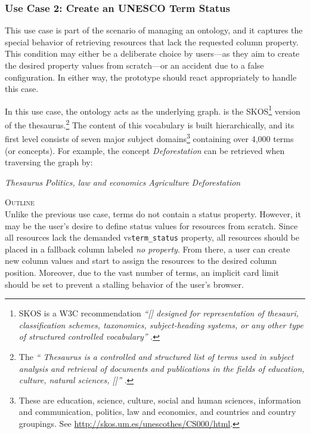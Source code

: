 \subsubsection{Use Case 2: Create an UNESCO Term Status}\label{ssec:UseCase2-Unesco Thesaurus}

This use case is part of the scenario of managing an ontology, and it captures the special behavior of retrieving resources that lack the requested column property. This condition may either be a deliberate choice by users—as they aim to create the desired property values from scratch—or an accident due to a false configuration. In either way, the prototype should react appropriately to handle this case.


In this use case, the  ontology \parencite{PastorSanchez2015} acts as the underlying graph. \mbox{} is the \acrshort*{SKOS}\footnote{\acrfull*{SKOS} is a W3C recommendation \textit{“[\textellipsis{}] designed for representation of thesauri, classification schemes, taxonomies, subject-heading systems, or any other type of structured controlled vocabulary”} \parencite[455]{Garoufallou2015}.} version of the  thesaurus.\footnote{The \textit{“ Thesaurus is a controlled and structured list of terms used in subject analysis and retrieval of documents and publications in the fields of education, culture, natural sciences, [\textellipsis{}]”} \parencite{UNESCO}.} The content of this vocabulary is built hierarchically, and its first level consists of seven major subject domains\footnote{These are education, science, culture, social and human sciences, information and communication, politics, law and economics, and countries and country groupings. See \url{http://skos.um.es/unescothes/CS000/html}.} containing over 4,000 terms (or concepts). For example, the concept \textit{Deforestation} can be retrieved when traversing the graph by:\\
\centerline{\textit{ Thesaurus} \textrightarrow {} \textit {Politics, law and economics} \textrightarrow{} \textit{Agriculture} \textrightarrow{} \textit{Deforestation}}



\vspace*{\baselineskip}

\noindent \textsc{Outline}\\
\noindent Unlike the previous use case,  terms do not contain a status property. However, it may be the user’s desire to define status values for resources from scratch. Since all  resources lack the demanded \acrshort{vs}\texttt{term\_status} property, all resources should be placed in a fallback column labeled \textit{no property}. From there, a user can create new column values and start to assign the resources to the desired column position. Moreover, due to the vast number of  terms, an implicit card limit should be set to prevent a stalling behavior of the user’s browser.


